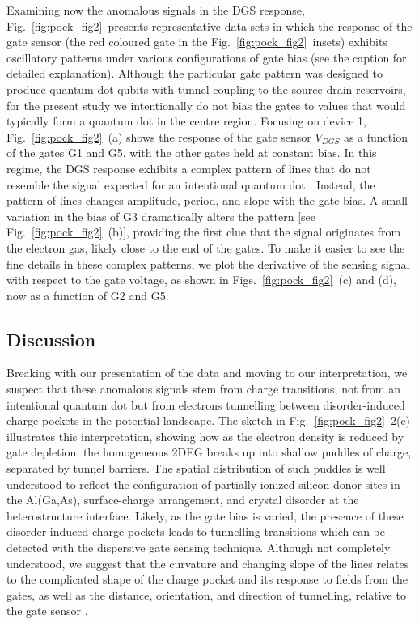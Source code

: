 Examining now the anomalous signals in the DGS response, Fig.~\ref{fig:pock_fig2}~presents representative data sets in which the response of the gate sensor (the red coloured gate in the Fig.~\ref{fig:pock_fig2}~insets) exhibits oscillatory patterns under various configurations of gate bias (see the caption for detailed explanation). Although the particular gate pattern was designed to produce quantum-dot qubits with tunnel coupling to the source-drain reservoirs, for the present study we intentionally do not bias the gates to values that would typically form a quantum dot in the centre region. Focusing on device 1, Fig.~\ref{fig:pock_fig2}~(a) shows the response of the gate sensor $V_{DGS}$ as a function of the gates G1 and G5, with the other gates held at constant bias. In this regime, the DGS response exhibits a complex pattern of lines that do not resemble the signal expected for an intentional quantum dot \cite{Colless_PRL}. Instead, the pattern of lines changes amplitude, period, and slope with the gate bias. A small variation in the bias of G3 dramatically alters the pattern [see Fig.~\ref{fig:pock_fig2}~(b)], providing the first clue that the signal originates from the electron gas, likely close to the end of the gates. To make it easier to see the fine details in these complex patterns, we plot the derivative of the sensing signal with respect to the gate voltage, as shown in Figs.~\ref{fig:pock_fig2}~(c) and (d), now as a function of G2 and G5.

\subsection{Discussion}
Breaking with our presentation of the data and moving to our interpretation, we suspect that these anomalous signals stem from charge transitions, not from an intentional quantum dot but from electrons tunnelling between disorder-induced charge pockets in the potential landscape. The sketch in Fig.~\ref{fig:pock_fig2}~2(e) illustrates this interpretation, showing how as the electron density is reduced by gate depletion, the homogeneous 2DEG breaks up into shallow puddles of charge, separated by tunnel barriers. The spatial distribution of such puddles is well understood \cite{PhysRevB.41.7929,Ilani1354} to reflect the configuration of partially ionized silicon donor sites in the Al(Ga,As), surface-charge arrangement, and crystal disorder at the heterostructure interface. Likely, as the gate bias is varied, the presence of these disorder-induced charge pockets leads to tunnelling transitions which can be detected with the dispersive gate sensing technique. Although not completely understood, we suggest that the curvature and changing slope of the lines relates to the complicated shape of the charge pocket and its response to fields from the gates, as well as the distance, orientation, and direction of tunnelling, relative to the gate sensor \cite{Ilani1354}.

